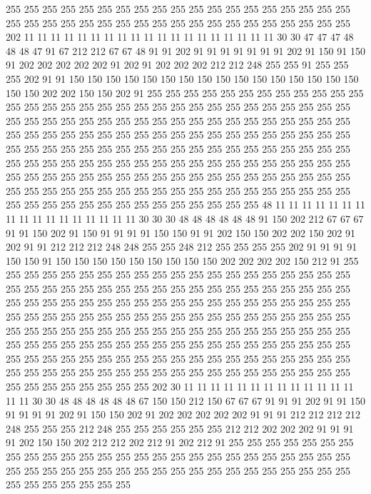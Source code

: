 255 255 255 255 255 255 255 255 255 255 255 255 255 255 255 255 255 255 255 255
255 255 255 255 255 255 255 255 255 255 255 255 255 255 255 255 255 255 202 11
11 11 11 11 11 11 11 11 11 11 11 11 11 11 11 11 11 11 30 30
47 47 47 48 48 48 47 91 67 212 212 67 67 48 91 91 202 91 91 91
91 91 91 91 202 91 150 91 150 91 202 202 202 202 202 91 202 91 202 202
202 212 212 248 255 255 91 255 255 255 202 91 91 150 150 150 150 150 150 150
150 150 150 150 150 150 150 150 150 150 150 202 202 150 150 202 91 255 255 255
255 255 255 255 255 255 255 255 255 255 255 255 255 255 255 255 255 255 255 255
255 255 255 255 255 255 255 255 255 255 255 255 255 255 255 255 255 255 255 255
255 255 255 255 255 255 255 255 255 255 255 255 255 255 255 255 255 255 255 255
255 255 255 255 255 255 255 255 255 255 255 255 255 255 255 255 255 255 255 255
255 255 255 255 255 255 255 255 255 255 255 255 255 255 255 255 255 255 255 255
255 255 255 255 255 255 255 255 255 255 255 255 255 255 255 255 255 255 255 255
255 255 255 255 255 255 255 255 255 255 255 255 255 255 255 255 255 255 255 255
255 255 255 255 255 255 255 255 255 255 255 255 255 255 255 255 48 11 11 11
11 11 11 11 11 11 11 11 11 11 11 11 11 11 30 30 30 48 48 48
48 48 48 91 150 202 212 67 67 67 91 91 150 202 91 150 91 91 91 91
150 150 91 91 202 150 150 202 202 150 202 91 202 91 91 212 212 212 248 248
255 255 248 212 255 255 255 255 202 91 91 91 91 150 150 91 150 150 150 150
150 150 150 150 150 202 202 202 202 150 212 91 255 255 255 255 255 255 255 255
255 255 255 255 255 255 255 255 255 255 255 255 255 255 255 255 255 255 255 255
255 255 255 255 255 255 255 255 255 255 255 255 255 255 255 255 255 255 255 255
255 255 255 255 255 255 255 255 255 255 255 255 255 255 255 255 255 255 255 255
255 255 255 255 255 255 255 255 255 255 255 255 255 255 255 255 255 255 255 255
255 255 255 255 255 255 255 255 255 255 255 255 255 255 255 255 255 255 255 255
255 255 255 255 255 255 255 255 255 255 255 255 255 255 255 255 255 255 255 255
255 255 255 255 255 255 255 255 255 255 255 255 255 255 255 255 255 255 255 255
255 255 255 255 255 255 255 255 255 255 255 255 255 202 30 11 11 11 11 11
11 11 11 11 11 11 11 11 11 11 30 30 48 48 48 48 48 48 67 150
150 212 150 67 67 67 91 91 91 202 91 91 150 91 91 91 91 202 91 150
150 202 91 202 202 202 202 202 91 91 91 212 212 212 212 248 255 255 255 212
248 255 255 255 255 255 255 212 212 202 202 202 91 91 91 91 202 150 150 202
212 212 202 212 91 202 212 91 255 255 255 255 255 255 255 255 255 255 255 255
255 255 255 255 255 255 255 255 255 255 255 255 255 255 255 255 255 255 255 255
255 255 255 255 255 255 255 255 255 255 255 255 255 255 255 255 255 255 255 255

